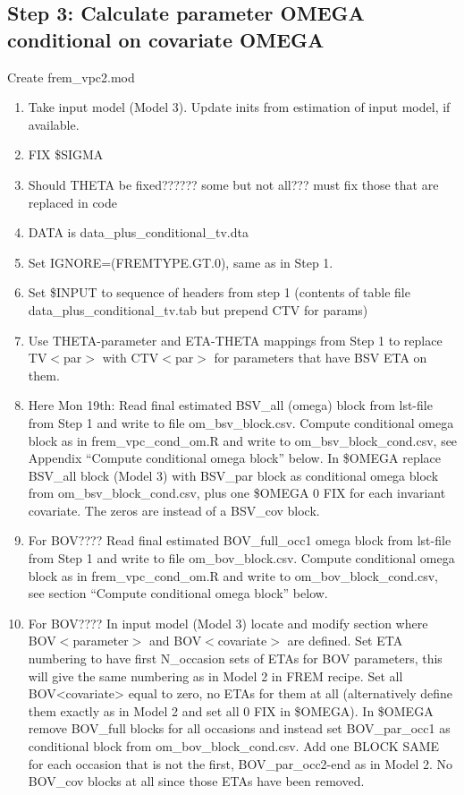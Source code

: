 \subsection{Step 3:  Calculate parameter OMEGA conditional on covariate OMEGA}
Create frem\_vpc2.mod
\begin{enumerate}
	\item Take input model (Model 3). Update inits from estimation of input model, if available. 
	\item FIX \$SIGMA
	\item Should THETA be fixed?????? some but not all??? must fix those that are replaced in code
	\item DATA is data\_plus\_conditional\_tv.dta
	\item Set IGNORE=(FREMTYPE.GT.0), same as in Step 1.
	\item Set \$INPUT to sequence of headers from step 1 (contents of table file data\_plus\_conditional\_tv.tab but prepend CTV for params)
	\item Use THETA-parameter and ETA-THETA mappings from Step 1 to replace TV$<$par$>$ with CTV$<$par$>$ for parameters that have BSV ETA on them.
	\item Here Mon 19th: Read final estimated BSV\_all (omega) block from lst-file from Step 1 and write to file om\_bsv\_block.csv. Compute conditional omega block as in frem\_vpc\_cond\_om.R and write to om\_bsv\_block\_cond.csv, see Appendix “Compute conditional omega block” below. In \$OMEGA replace BSV\_all block (Model 3) with BSV\_par block as conditional omega block from om\_bsv\_block\_cond.csv, plus one \$OMEGA 0 FIX for each invariant covariate. The zeros are instead of a BSV\_cov block.
	\item For BOV???? Read final estimated BOV\_full\_occ1 omega block from lst-file from Step 1 and write to file om\_bov\_block.csv. Compute conditional omega block as in frem\_vpc\_cond\_om.R and write to om\_bov\_block\_cond.csv, see section “Compute conditional omega block” below.  
	\item For BOV???? In input model (Model 3) locate and modify section where BOV$<$parameter$>$ and BOV$<$covariate$>$ are defined. Set ETA numbering to have first N\_occasion sets of ETAs for BOV parameters, this will give the same numbering as in Model 2 in FREM recipe. Set all BOV<covariate> equal to zero, no ETAs for them at all (alternatively define them exactly as in Model 2 and set all 0 FIX in \$OMEGA). In \$OMEGA remove BOV\_full blocks for all occasions and instead set BOV\_par\_occ1 as conditional block from om\_bov\_block\_cond.csv. Add one BLOCK SAME for each occasion that is not the first, BOV\_par\_occ2-end as in Model 2. No BOV\_cov blocks at all since those ETAs have been removed. 
\end{enumerate}

